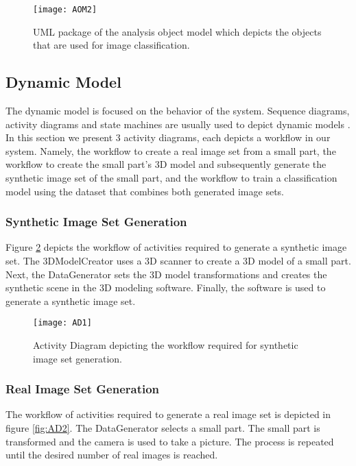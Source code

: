 \begin{figure}[H]
\centering
  \texttt{[image: AOM2]}
\caption{UML package of the analysis object model which depicts the objects that are used for image classification.}
\label{fig:AOM2}
\end{figure}

\newpage
\subsection{Dynamic Model}\label{dynamic_model}
The dynamic model is focused on the behavior of the system. Sequence diagrams, activity diagrams and state machines are usually used to depict dynamic models \cite{bruegge2004object}. In this section we present 3 activity diagrams, each depicts a workflow in our system. Namely, the workflow to create a real image set from a small part, the workflow to create the small part's 3D model and subsequently generate the synthetic image set of the small part, and the workflow to train a classification model using the dataset that combines both generated image sets.

\subsubsection{Synthetic Image Set Generation}
Figure \ref{fig:AD1} depicts the workflow of activities required to generate a synthetic image set. The 3DModelCreator uses a 3D scanner to create a 3D model of a small part. Next, the DataGenerator sets the 3D model transformations and creates the synthetic scene in the 3D modeling software. Finally, the software is used to generate a synthetic image set.

\begin{figure}[H]
\centering
  \texttt{[image: AD1]}
\caption{Activity Diagram depicting the workflow required for synthetic image set generation.}
\label{fig:AD1}
\end{figure}

\subsubsection{Real Image Set Generation}
The workflow of activities required to generate a real image set is depicted in figure \ref{fig:AD2}. The DataGenerator selects a small part. The small part is transformed and the camera is used to take a picture. The process is repeated until the desired number of real images is reached.

